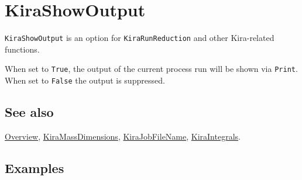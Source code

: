 \documentclass[../FeynHelpersManual.tex]{subfiles}
\begin{document}
\hypertarget{kirashowoutput}{
\section{KiraShowOutput}\label{kirashowoutput}}

\texttt{KiraShowOutput} is an option for \texttt{KiraRunReduction} and
other Kira-related functions.

When set to \texttt{True}, the output of the current process run will be
shown via \texttt{Print}. When set to \texttt{False} the output is
suppressed.

\subsection{See also}

\hyperlink{toc}{Overview},
\hyperlink{kiramassdimensions}{KiraMassDimensions},
\hyperlink{kirajobfilename}{KiraJobFileName},
\hyperlink{kiraintegrals}{KiraIntegrals}.

\subsection{Examples}
\end{document}
